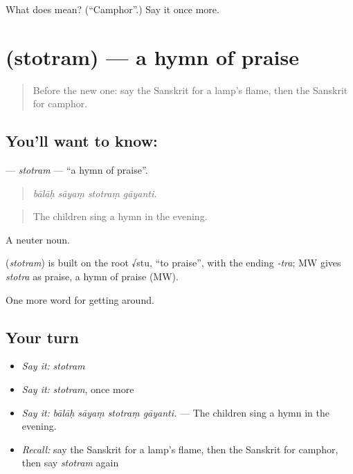 \begin{tcolorbox}[breakable,colback=teal!4,colframe=teal!35!black,title={Before you move on}]
What does  mean? (\textquotedblleft{}Camphor\textquotedblright{}.) Say it once more.
\end{tcolorbox}
\section[\texorpdfstring{\sk{स्तोत्रम्} (stotram)}{स्तोत्रम् (stotram)}]{ (stotram) — a hymn of praise}

\label{lesson:SA-C397-stotram}



\begin{quote}
Before the new one: say the Sanskrit for a lamp's flame, then the Sanskrit for camphor.
\end{quote}

\subsection*{You'll want to know: }
\textbf{} — \emph{stotram} — \textquotedblleft{}a hymn of praise\textquotedblright{}.

\begin{quote}
   
\end{quote}

\begin{quote}
\emph{bālāḥ sāyaṃ stotraṃ gāyanti.}
\end{quote}

\begin{quote}
The children sing a hymn in the evening.
\end{quote}

A neuter noun.

\begin{cousinweb}
\textbf{} (\emph{stotram}) is built on the root √stu, \textquotedblleft{}to praise\textquotedblright{}, with the ending \emph{-tra}; MW gives \emph{stotra} as praise, a hymn of praise (MW).
\end{cousinweb}

\begin{grammarlens}[title={What you've built}]
One more word for getting around.
\end{grammarlens}

\subsection*{Your turn}
\begin{itemize}
\raggedright
  \item \emph{Say it:} \emph{stotram}
  \item \emph{Say it:} \emph{stotram}, once more
  \item \emph{Say it:} \emph{bālāḥ sāyaṃ stotraṃ gāyanti.} — The children sing a hymn in the evening.
  \item \emph{Recall:} say the Sanskrit for a lamp's flame, then the Sanskrit for camphor, then say \emph{stotram} again
\end{itemize}

